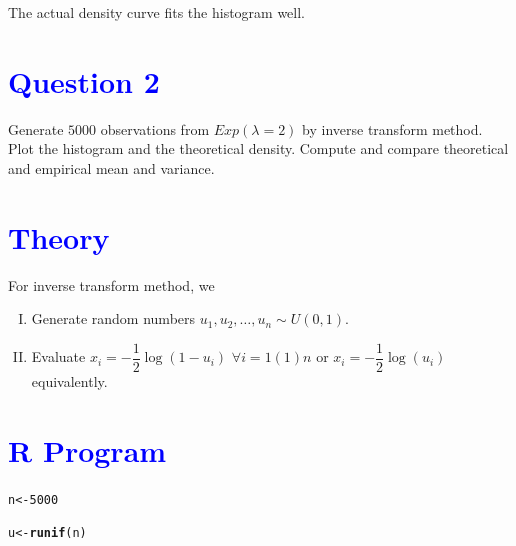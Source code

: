 \documentclass[11pt, a4paper]{article}\usepackage[]{graphicx}\usepackage[]{xcolor}
\makeatletter
\newcommand{\hlnum}[1]{\textcolor[rgb]{0.686,0.059,0.569}{#1}}%
\newcommand{\hldef}[1]{\textcolor[rgb]{0.345,0.345,0.345}{#1}}%
\newcommand{\hlkwb}[1]{\textcolor[rgb]{0.69,0.353,0.396}{#1}}%
\newcommand{\hlkwd}[1]{\textcolor[rgb]{0.737,0.353,0.396}{\textbf{#1}}}%
\newenvironment{kframe}{%
 \def\at@end@of@kframe{}%
 \ifinner\ifhmode%
  \def\at@end@of@kframe{\end{minipage}}%
  \begin{minipage}{\columnwidth}%
 \fi\fi%
 \def\FrameCommand##1{\hskip\@totalleftmargin \hskip-\fboxsep
 \colorbox{shadecolor}{##1}\hskip-\fboxsep
     \hskip-\linewidth \hskip-\@totalleftmargin \hskip\columnwidth}%
 \MakeFramed {\advance\hsize-\width
   \@totalleftmargin\z@ \linewidth\hsize
   \@setminipage}}%
 {\par\unskip\endMakeFramed%
 \at@end@of@kframe}
\newenvironment{knitrout}{}{} %
\makeatother
\begin{document}
\smallpencil \hspace{0.1cm} {\setlength{\spaceskip}{1em plus 0.5em minus 0.5em} \fontsize{17}{20}\myfont The actual density curve fits the histogram well. \par}

\newpage

\section*{\faArrowAltCircleRight[regular] \textcolor{blue}{Question 2}}

\hspace{1cm} Generate $5000$ observations from $Exp(\lambda = 2)$ by inverse transform method. Plot the histogram and the theoretical density. Compute and compare theoretical and empirical mean and variance.

\section*{\faArrowAltCircleRight[regular] \textcolor{blue}{Theory}}

For inverse transform method, we 

\begin{enumerate}[I.]
\item Generate random numbers $u_1, u_2, \ldots, u_n \sim U(0, 1)$.
\item Evaluate $x_i = - \dfrac{1}{2} \log(1 - u_i) \,\, \forall i = 1(1)n$ or $x_i = - \dfrac{1}{2} \log(u_i)$ equivalently.
\end{enumerate}

\section*{\faArrowAltCircleRight[regular] \textcolor{blue}{R Program}}

\begin{knitrout}
\color{fgcolor}\begin{kframe}
\begin{alltt}
\hldef{n} \hlkwb{<-} \hlnum{5000}
\end{alltt}
\end{kframe}
\end{knitrout}

\begin{knitrout}
\color{fgcolor}\begin{kframe}
\begin{alltt}
\hldef{u} \hlkwb{<-} \hlkwd{runif}\hldef{(n)}
\end{alltt}
\end{kframe}
\end{knitrout}
\end{document}
